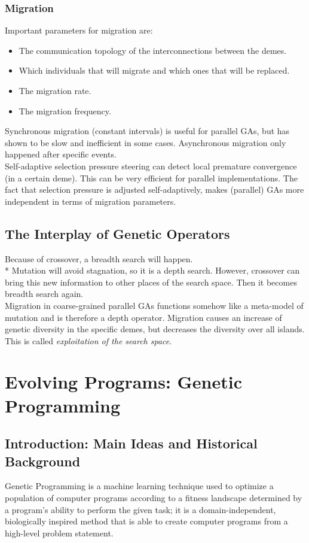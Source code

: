 \documentclass[12pt]{book}
\begin{document}
\subsection{Migration}
Important parameters for migration are:
\begin{itemize}
\item The communication topology of the interconnections between the demes.
\item Which individuals that will migrate and which ones that will be replaced.
\item The migration rate.
\item The migration frequency.
\end{itemize}
Synchronous migration (constant intervals) is useful for parallel GAs, but has shown to be slow and inefficient in some cases. Asynchronous migration only happened after specific events.\\
Self-adaptive selection pressure steering can detect local premature convergence (in a certain deme). This can be very efficient for parallel implementations. The fact that selection pressure is adjusted self-adaptively, makes (parallel) GAs more independent in terms of migration parameters.
\section{The Interplay of Genetic Operators}
Because of crossover, a breadth search will happen.\\*
Mutation will avoid stagnation, so it is a depth search. However, crossover can bring this new information to other places of the search space. Then it becomes breadth search again.\\
Migration in coarse-grained parallel GAs functions somehow like a meta-model of mutation and is therefore a depth operator. Migration causes an increase of genetic diversity in the specific demes, but decreases the diversity over all islands. This is called \textit{exploitation of the search space}.
\clearpage
\chapter{Evolving Programs: Genetic Programming}
\section{Introduction: Main Ideas and Historical Background}
Genetic Programming is a machine learning technique used to optimize a population of computer programs according to a fitness landscape determined by a program's ability to perform the given task; it is a domain-independent, biologically inspired method that is able to create computer programs from a high-level problem statement.
\end{document}
